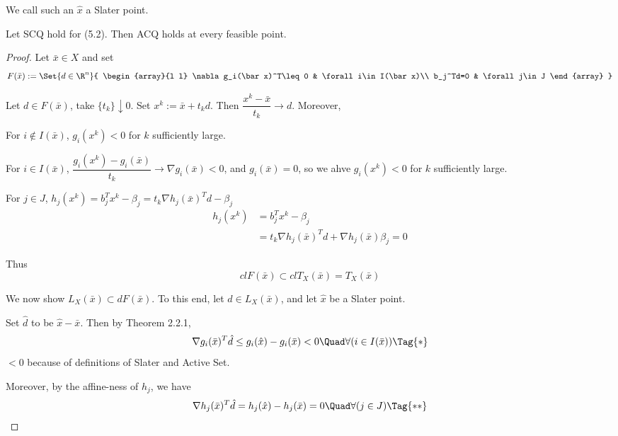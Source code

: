 We call such an $\hat x$ a Slater point.


Let SCQ hold for (5.2). Then ACQ holds at every feasible point.

\begin{proof}
	\def\bx{\bar x}\def\bl{\bar\lambda}\def\bm{\bar\mu}
	\def\LC{L_X(\bar x)}
	\def\TC{T_X(\bar x)}
	\def\Act{I(\bx)}

	Let $\bx\in X$ and set
	$$
		F(\bx):=\Set{d\in\R^n}{
			\begin{array}{l l}
				\nabla g_i(\bx)^T\leq0 & \forall i\in\Act \\
				b_j^Td=0               & \forall j\in J
			\end{array}
		}
	$$

	\Lemma{}{$F(\bx)\subset T_X(\bx)$} Let $d\in F(\bx)$, take
	$\{t_k\}\downarrow0$. Set $x^k:=\bar x+t_kd$. Then $\dfrac{x^k-\bar
			x}{t_k}\to d$. Moreover,

	For $i\notin\Act$, $g_i(x^k)<0$ for $k$ sufficiently large.

	For $i\in\Act$, $\dfrac{g_i(x^k)-g_i(\bx)}{t_k}\to\nabla
		g_i(\bx)<0$, and $g_i(\bx)=0$, so we ahve $g_i(x^k)<0$ for $k$
	sufficiently large.

	For $j\in J$, $h_j(x^k)=b_j^Tx^k-\beta_j=t_k\nabla h_j(\bx)^Td-\beta_j$
	\begin{align}
		h_j(x^k) & =b_j^Tx^k-\beta_j                                 \\
		         & =t_k\nabla h_j(\bx)^Td+\nabla h_j(\bx)\beta_j = 0
	\end{align}

	Thus
	$$
		cl F(\bx)\subset cl\TC=\TC
	$$

	We now show $\LC\subset dF(\bx)$. To this end, let $d\in\LC$, and
	let $\hat x$ be a Slater point.

	Set $\hat d$ to be $\hat x-\bar x$. Then by Theorem 2.2.1,
	\begin{equation}
		\nabla g_i(\bx)^T\hat d\leq g_i(\hat x) - g_i(\bx)<0\Quad\forall(i\in\Act)\Tag{*}
	\end{equation}
	$<0$ because of definitions of Slater and Active Set.

	Moreover, by the affine-ness of $h_j$, we have
	\begin{align}
		\nabla h_j(\bx)^T\hat d = h_j(\hat x)-h_j(\bx)=0\Quad\forall(j\in J)\Tag{**}
	\end{align}


\end{proof}
